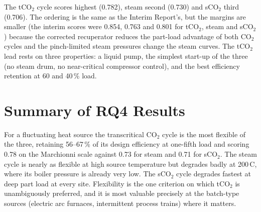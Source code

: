 The tCO$_2$ cycle scores highest (0.782), steam second (0.730) and sCO$_2$
third (0.706). The ordering is the same as the Interim Report's, but the
margins are smaller (the interim scores were 0.854, 0.763 and 0.801 for
tCO$_2$, steam and sCO$_2$) because the corrected recuperator reduces the
part-load advantage of both CO$_2$ cycles and the pinch-limited steam
pressures change the steam curves. The tCO$_2$ lead rests on three
properties: a liquid pump, the simplest start-up of the three (no steam drum,
no near-critical compressor control), and the best efficiency retention at
60 and 40\,\% load.

\section{Summary of RQ4 Results}
\label{sec:rq4_summary}

For a fluctuating heat source the transcritical CO$_2$ cycle is the most
flexible of the three, retaining 56--67\,\% of its design efficiency at
one-fifth load and scoring 0.78 on the Marchionni scale against 0.73 for
steam and 0.71 for sCO$_2$. The steam cycle is nearly as flexible at high
source temperature but degrades badly at 200\,\textdegree C, where its boiler
pressure is already very low. The sCO$_2$ cycle degrades fastest at deep
part load at every site. Flexibility is the one criterion on which tCO$_2$
is unambiguously preferred, and it is most valuable precisely at the
batch-type sources (electric arc furnaces, intermittent process trains)
where it matters.
